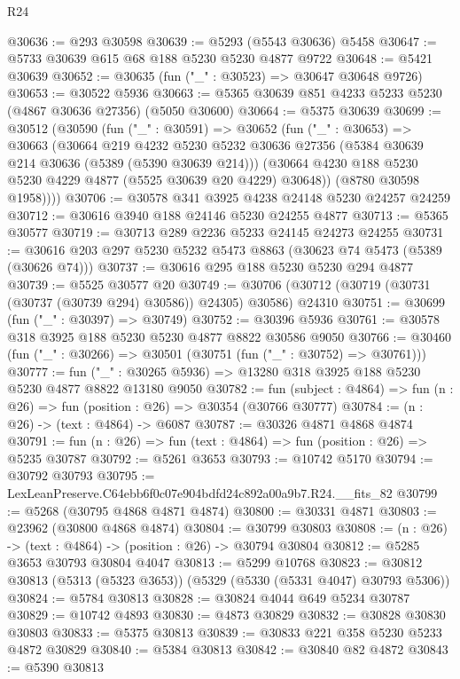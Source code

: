 \begin{lexlean}{R24}
\begin{coremodule}
@30636 := @293 @30598
@30639 := @5293 (@5543 @30636) @5458
@30647 := @5733 @30639 @615 @68 @188 @5230 @5230 @4877 @9722
@30648 := @5421 @30639
@30652 := @30635 (fun ("_" : @30523) => @30647 @30648 @9726)
@30653 := @30522 @5936
@30663 := @5365 @30639 @851 @4233 @5233 @5230 (@4867 @30636 @27356) (@5050 @30600)
@30664 := @5375 @30639
@30699 := @30512
    (@30590
      (fun ("_" : @30591) =>
      @30652
        (fun ("_" : @30653) =>
        @30663
          (@30664
            @219
            @4232
            @5230
            @5232
            @30636
            @27356
            (@5384 @30639 @214 @30636 (@5389 (@5390 @30639 @214)))
            (@30664 @4230 @188 @5230 @5230 @4229 @4877 (@5525 @30639 @20 @4229) @30648))
          (@8780 @30598 @1958))))
@30706 := @30578 @341 @3925 @4238 @24148 @5230 @24257 @24259
@30712 := @30616 @3940 @188 @24146 @5230 @24255 @4877
@30713 := @5365 @30577
@30719 := @30713 @289 @2236 @5233 @24145 @24273 @24255
@30731 := @30616 @203 @297 @5230 @5232 @5473 @8863 (@30623 @74 @5473 (@5389 (@30626 @74)))
@30737 := @30616 @295 @188 @5230 @5230 @294 @4877
@30739 := @5525 @30577 @20
@30749 := @30706 (@30712 (@30719 (@30731 (@30737 (@30739 @294) @30586)) @24305) @30586) @24310
@30751 := @30699 (fun ("_" : @30397) => @30749)
@30752 := @30396 @5936
@30761 := @30578 @318 @3925 @188 @5230 @5230 @4877 @8822 @30586 @9050
@30766 := @30460 (fun ("_" : @30266) => @30501 (@30751 (fun ("_" : @30752) => @30761)))
@30777 := fun ("_" : @30265 @5936) => @13280 @318 @3925 @188 @5230 @5230 @4877 @8822 @13180 @9050
@30782 := fun (subject : @4864) => fun (n : @26) => fun (position : @26) => @30354 (@30766 @30777)
@30784 := (n : @26) -> (text : @4864) -> @6087
@30787 := @30326 @4871 @4868 @4874
@30791 := fun (n : @26) => fun (text : @4864) => fun (position : @26) => @5235 @30787
@30792 := @5261 @3653
@30793 := @10742 @5170
@30794 := @30792 @30793
@30795 := LexLeanPreserve.C64ebb6f0c07e904bdfd24c892a00a9b7.R24.__fits_82
@30799 := @5268 (@30795 @4868 @4871 @4874)
@30800 := @30331 @4871
@30803 := @23962 (@30800 @4868 @4874)
@30804 := @30799 @30803
@30808 := (n : @26) -> (text : @4864) -> (position : @26) -> @30794 @30804
@30812 := @5285 @3653 @30793 @30804 @4047
@30813 := @5299 @10768
@30823 := @30812 @30813 (@5313 (@5323 @3653)) (@5329 (@5330 (@5331 @4047) @30793 @5306))
@30824 := @5784 @30813
@30828 := @30824 @4044 @649 @5234 @30787
@30829 := @10742 @4893
@30830 := @4873 @30829
@30832 := @30828 @30830 @30803
@30833 := @5375 @30813
@30839 := @30833 @221 @358 @5230 @5233 @4872 @30829
@30840 := @5384 @30813
@30842 := @30840 @82 @4872
@30843 := @5390 @30813

\end{coremodule}
\end{lexlean}
